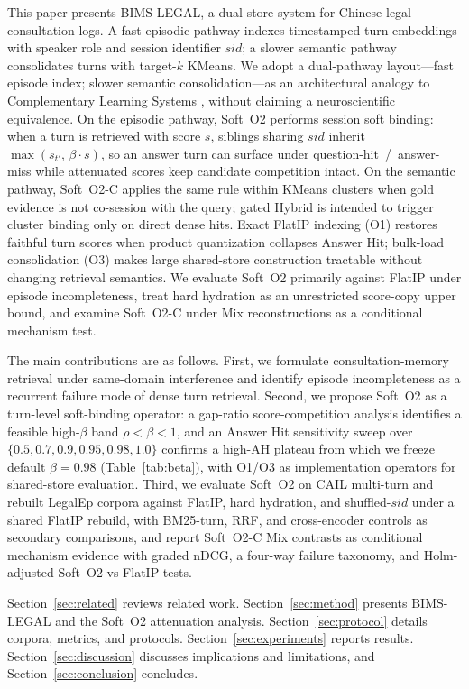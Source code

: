 \documentclass[preprint,12pt,authoryear]{elsarticle}
\begin{document}
This paper presents BIMS-LEGAL, a dual-store system for Chinese legal consultation logs.
A fast episodic pathway indexes timestamped turn embeddings with speaker role and session identifier $sid$; a slower semantic pathway consolidates turns with target-$k$ KMeans.
We adopt a dual-pathway layout---fast episode index; slower semantic consolidation---as an architectural analogy to Complementary Learning Systems \cite{mcclelland1995complementary, kumaran2016}, without claiming a neuroscientific equivalence.
On the episodic pathway, Soft~O2 performs session soft binding: when a turn is retrieved with score $s$, siblings sharing $sid$ inherit $\max(s_{t'},\,\beta\cdot s)$, so an answer turn can surface under question-hit~/~answer-miss while attenuated scores keep candidate competition intact.
On the semantic pathway, Soft~O2-C applies the same rule within KMeans clusters when gold evidence is not co-session with the query; gated Hybrid is intended to trigger cluster binding only on direct dense hits.
Exact FlatIP indexing (O1) restores faithful turn scores when product quantization collapses Answer Hit; bulk-load consolidation (O3) makes large shared-store construction tractable without changing retrieval semantics.
We evaluate Soft~O2 primarily against FlatIP under episode incompleteness, treat hard hydration as an unrestricted score-copy upper bound, and examine Soft~O2-C under Mix reconstructions as a conditional mechanism test.

The main contributions are as follows.
First, we formulate consultation-memory retrieval under same-domain interference and identify episode incompleteness as a recurrent failure mode of dense turn retrieval.
Second, we propose Soft~O2 as a turn-level soft-binding operator: a gap-ratio score-competition analysis identifies a feasible high-$\beta$ band $\rho{<}\beta{<}1$, and an Answer Hit sensitivity sweep over $\{0.5,0.7,0.9,0.95,0.98,1.0\}$ confirms a high-AH plateau from which we freeze default $\beta{=}0.98$ (Table~\ref{tab:beta}), with O1/O3 as implementation operators for shared-store evaluation.
Third, we evaluate Soft~O2 on CAIL multi-turn and rebuilt LegalEp corpora against FlatIP, hard hydration, and shuffled-$sid$ under a shared FlatIP rebuild, with BM25-turn, RRF, and cross-encoder controls as secondary comparisons, and report Soft~O2-C Mix contrasts as conditional mechanism evidence with graded nDCG, a four-way failure taxonomy, and Holm-adjusted Soft~O2 vs FlatIP tests.

Section~\ref{sec:related} reviews related work.
Section~\ref{sec:method} presents BIMS-LEGAL and the Soft~O2 attenuation analysis.
Section~\ref{sec:protocol} details corpora, metrics, and protocols.
Section~\ref{sec:experiments} reports results.
Section~\ref{sec:discussion} discusses implications and limitations, and Section~\ref{sec:conclusion} concludes.
\end{document}
